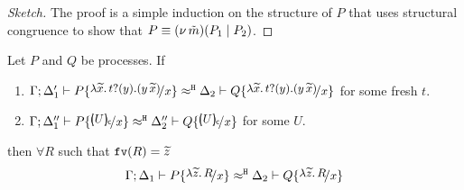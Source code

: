 \begin{proof}[Sketch]
	The proof is a simple induction on the structure
	of $P$ that uses structural congruence to show that
	$P \equiv (\nu\, \tilde{m})(P_1 \;|\; P_2)$.
\end{proof}




\begin{lemma}
	\label{app:lem:proc_subst}
	Let $P$ and $Q$ be processes. If 
%
	\begin{enumerate}
		\item	$\horel{\Gamma}{\Delta_1'}{P \subst{\auxtr{t}}{x}}{\hwb}{\Delta_2}{Q \subst{\auxtr{t}}{x}}$
			for some fresh $t$.

		\item	$\horel{\Gamma}{\Delta_1''}{P \subst{\omapchar{U}}{x}}{\hwb}{\Delta_2''}{Q \subst{\omapchar{U}}{x}}$
			for some $U$.
	\end{enumerate}
%
	then $\forall R$ such that $\mathtt{fv}(R) = \widetilde{z}$
\[
	\horel{\Gamma}{\Delta_1}{P \subst{\abs{\widetilde{z}}{R}}{x}}{\hwb}{\Delta_2}{Q \subst{\abs{\widetilde{z}}{R}}{x}}
\]
\end{lemma}


